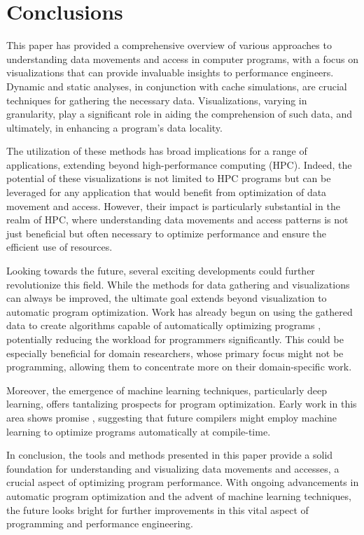 \section{Conclusions}
This paper has provided a comprehensive overview of various approaches to understanding data movements and access in computer programs, with a focus on visualizations that can provide invaluable insights to performance engineers. Dynamic and static analyses, in conjunction with cache simulations, are crucial techniques for gathering the necessary data. Visualizations, varying in granularity, play a significant role in aiding the comprehension of such data, and ultimately, in enhancing a program's data locality.

The utilization of these methods has broad implications for a range of applications, extending beyond high-performance computing (HPC). Indeed, the potential of these visualizations is not limited to HPC programs but can be leveraged for any application that would benefit from optimization of data movement and access. However, their impact is particularly substantial in the realm of HPC, where understanding data movements and access patterns is not just beneficial but often necessary to optimize performance and ensure the efficient use of resources.

Looking towards the future, several exciting developments could further revolutionize this field. While the methods for data gathering and visualizations can always be improved, the ultimate goal extends beyond visualization to automatic program optimization. Work has already begun on using the gathered data to create algorithms capable of automatically optimizing programs \cite{calotoiu2022lifting}, potentially reducing the workload for programmers significantly. This could be especially beneficial for domain researchers, whose primary focus might not be programming, allowing them to concentrate more on their domain-specific work.

Moreover, the emergence of machine learning techniques, particularly deep learning, offers tantalizing prospects for program optimization. Early work in this area shows promise \cite{cummins2021programl}, suggesting that future compilers might employ machine learning to optimize programs automatically at compile-time.

In conclusion, the tools and methods presented in this paper provide a solid foundation for understanding and visualizing data movements and accesses, a crucial aspect of optimizing program performance. With ongoing advancements in automatic program optimization and the advent of machine learning techniques, the future looks bright for further improvements in this vital aspect of programming and performance engineering.